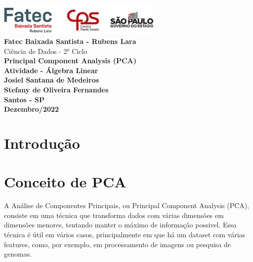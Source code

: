 \documentclass{article}
\begin{document}
\thispagestyle{empty}

\begin{center}
    \includegraphics[width=8cm]{fateclogo.png}\\
    \vspace{1cm}
    \textbf{Fatec Baixada Santista - Rubens Lara}\\
    Ciência de Dados - 2° Ciclo\\
    \vspace{4.4cm}
    \textbf{Principal Component Analysis (PCA)}\\
    \textbf{Atividade - Álgebra Linear }\\
    \vspace{4.4cm}
    \textbf{Josiel Santana de Medeiros}\\
    \textbf{Stefany de Oliveira Fernandes}\\
    \vspace{4.4cm}
    \textbf{Santos - SP}\\
    \textbf{Dezembro/2022}
\end{center}

\clearpage
\setcounter{page}{1}

\section{Introdução}
\section*{Conceito de PCA}
\begin{flushleft}
    A Análise de Componentes Principais, ou Principal Component Analysis (PCA), consiste em uma técnica que transforma dados com várias dimensões em dimensões menores, tentando manter o máximo de informação possivel.
    \newline
    Essa técnica é útil em vários casos, principalmente em que há um dataset com várias features, como, por exemplo, em processamento de imagens ou pesquisa de genomas.
\end{flushleft}
\end{document}
